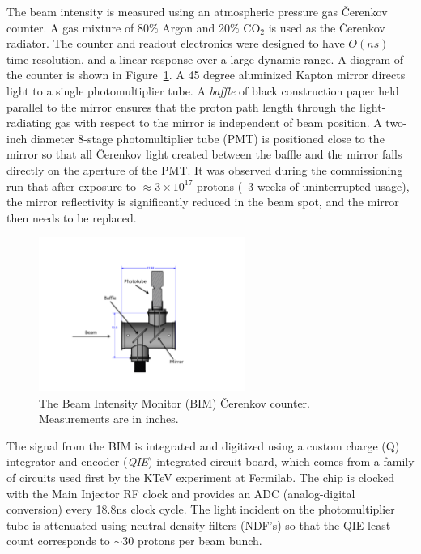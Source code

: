 The beam intensity is measured using an atmospheric pressure gas \v{C}erenkov counter. A gas mixture of 80$\%$ Argon and 20$\%$ CO$_2$ is used as the \v{C}erenkov radiator. The counter and readout electronics were designed to have $O(ns)$ time resolution, and a linear response over a large dynamic range.  A diagram of the counter is shown in Figure~\ref{fig:BIMCerenkov}.  A 45 degree aluminized Kapton mirror directs light to a single photomultiplier tube.  A \emph{baffle} of black construction paper held parallel to the mirror ensures that the proton path length through the light-radiating gas with respect to the mirror is independent of beam position. A two-inch diameter 8-stage photomultiplier tube (PMT) is positioned close to the mirror so that all \v{C}erenkov light created between the baffle and the mirror falls directly on the aperture of the PMT. It was observed during the commissioning run that after exposure to $\approx 3 \times 10^{17}$ protons (~3 weeks of uninterrupted usage), the mirror reflectivity is significantly reduced in the beam spot, and the mirror then needs to be replaced.

\begin{figure}
	\begin{center}
		\includegraphics[width=0.6\textwidth]{figures/apparatus/BIMCerenkov.pdf}
		\caption{The Beam Intensity Monitor (BIM) \v{C}erenkov counter. Measurements are in inches.}
		\label{fig:BIMCerenkov}
	\end{center}
\end{figure}

The signal from the BIM is integrated and digitized using a custom charge (Q) integrator and encoder (\emph{QIE}) integrated circuit board, which comes from a family of circuits used first by the KTeV experiment at Fermilab\cite{QIE}. The chip is clocked with the Main Injector RF clock and provides an ADC (analog-digital conversion) every 18.8ns clock cycle. The light incident on the photomultiplier tube is attenuated using neutral density filters (NDF's) so that the QIE least count corresponds to $\sim$30 protons per beam bunch.

